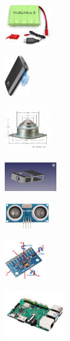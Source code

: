 \documentclass{beamer}
\begin{document}
\begin{frame}
\begin{minipage}{0.3\textwidth}
    \centering
    \includegraphics[width=2.0cm]{figs/bateria.jpg} 
\end{minipage}
\hfill
\begin{minipage}{0.3\textwidth}
    \centering
    \includegraphics[width=1.1cm]{figs/powerbank.jpg} 
\end{minipage}
\hfill
\begin{minipage}{0.3\textwidth}
    \centering
    \includegraphics[width=2.0cm]{figs/rueda_loca.png}
\end{minipage}



\begin{minipage}{0.3\textwidth}
    \centering
    \includegraphics[width=2.3cm]{figs/base.png} 
\end{minipage}
\hfill
\begin{minipage}{0.3\textwidth}
    \centering
    \includegraphics[width=2.0cm]{figs/hcsr04.jpg} 
\end{minipage}
\hfill
\begin{minipage}{0.3\textwidth}
    \centering
    \includegraphics[width=1.8cm]{figs/mpu9250.jpg}
\end{minipage}

\vspace{-0.5cm} %

\begin{center}
    \includegraphics[width=2.7cm]{figs/raspberry4.png}
\end{center}

\end{frame}
\end{document}
